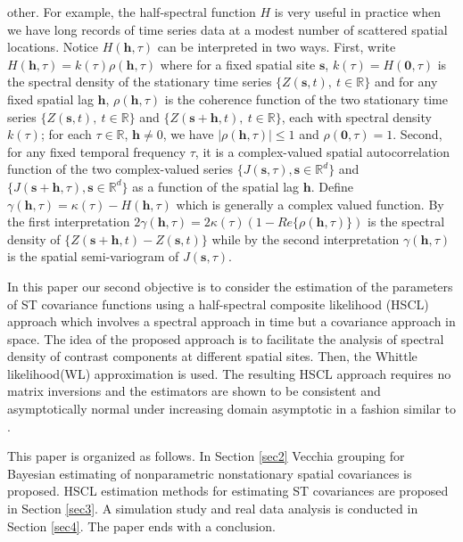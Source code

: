\documentclass[twoside]{article}
\renewcommand{\/}[1]{\mathbf{\boldsymbol{#1}}}
\begin{document}
other. For example, the  half-spectral function $H$ is very useful
in practice  when we have long records of time series data at a
modest number of scattered spatial locations. Notice $H(\/h,\tau)$ can be interpreted in two ways. First, write $H(\/h,\tau)=k(\tau)\rho(\/h, \tau)$
where for a fixed spatial site $\/s$, $k(\tau)=H(\/0, \tau)$ is the spectral
density of the stationary time series $\{Z(\/s, t),\
t\in\mathbb{R}\}$ and for any fixed spatial lag $\/h$, $\rho(\/h, \tau)$
is the coherence function of the two stationary time series $\{Z(\/s,
t),\ t\in\mathbb{R}\} $ and $\{Z(\/s+\/h, t),\ t\in\mathbb{R} \}$,
each with spectral density $k(\tau)$; for each $\tau\in \mathbb{R} $,
$\/h\neq 0$, we have $| \rho(\/h, \tau)|\leq1$ and $\rho(\/0,
\tau)=1$.
Second, for any fixed temporal frequency $\tau$, it is a  complex-valued spatial autocorrelation function of the two complex-valued series
$\{J(\/s,\tau), \/s\in \mathbb{R}^d\}$ and
$\{J(\/s+\/h,\tau), \/s\in \mathbb{R}^d\}$ as a function of the spatial lag $\/h$.
Define   $ \gamma(\/h,\tau)=\kappa(\tau)-H(\/h,\tau)$  which is generally a complex valued function.
By the first interpretation $ 2\gamma(\/h,\tau)=2\kappa(\tau)(1-Re\{\rho(\/h,\tau)\})$ is the spectral density  of
$\{Z(\/s+\/h,t)-Z(\/s,t)\}$ while by the second interpretation $  \gamma(\/h,\tau)$ is the spatial semi-variogram of $J(\/s,\tau)$.

In this paper our second objective is to consider the estimation of the parameters of ST covariance functions using a half-spectral composite likelihood (HSCL) approach which involves a spectral approach in time but a covariance approach in space. The idea of  the proposed approach  is to facilitate the
  analysis of spectral density  of contrast components at
  different spatial sites. Then,   the Whittle likelihood(WL) approximation  is used.
The  resulting HSCL approach requires no matrix inversions and
the estimators are shown to be consistent and asymptotically normal under increasing domain asymptotic in a fashion similar to  \cite{bevilacqua2012estimating}.

This paper is organized as follows.  In Section \ref{sec2} Vecchia  grouping for Bayesian estimating  of nonparametric nonstationary spatial covariances is proposed.    HSCL  estimation methods for  estimating ST covariances are proposed in Section \ref{sec3}.  A simulation study and real data analysis is conducted in Section \ref{sec4}. The paper ends with a conclusion.
\end{document}
